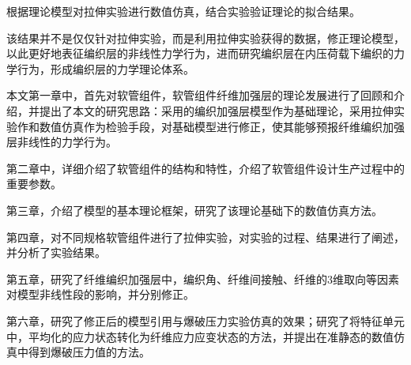根据理论模型对拉伸实验进行数值仿真，结合实验验证理论的拟合结果。

该结果并不是仅仅针对拉伸实验，而是利用拉伸实验获得的数据，修正理论模型，以此更好地表征编织层的非线性力学行为，进而研究编织层在内压荷载下编织的力学行为，形成编织层的力学理论体系。

本文第一章中，首先对软管组件，软管组件纤维加强层的理论发展进行了回顾和介绍，并提出了本文的研究思路：采用\ha 的编织加强层模型作为基础理论，采用拉伸实验作和数值仿真作为检验手段，对基础模型进行修正，使其能够预报纤维编织加强层非线性的力学行为。

第二章中，详细介绍了软管组件的结构和特性，介绍了软管组件设计生产过程中的重要参数。

第三章，介绍了\ha 模型的基本理论框架，研究了该理论基础下的数值仿真方法。

第四章，对不同规格软管组件进行了拉伸实验，对实验的过程、结果进行了阐述，并分析了实验结果。

第五章，研究了纤维编织加强层中，编织角、纤维间接触、纤维的3维取向等因素对模型非线性段的影响，并分别修正。

第六章，研究了修正后的模型引用与爆破压力实验仿真的效果；研究了将特征单元中，平均化的应力状态转化为纤维应力应变状态的方法，并提出在准静态的数值仿真中得到爆破压力值的方法。

